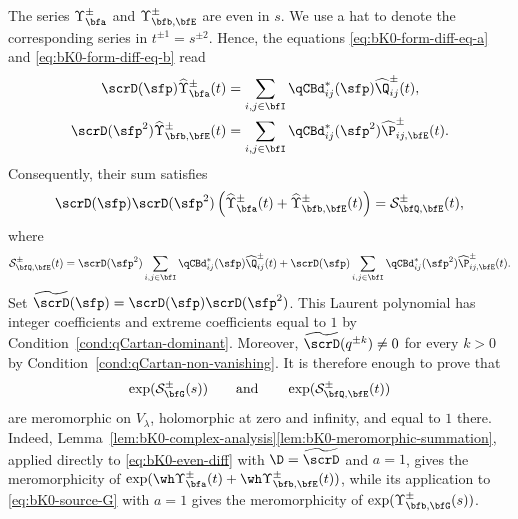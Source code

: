 \documentclass[reqno]{amsart}
\numberwithin{equation}{section}
\begin{document}
The series $\Upsilon_{\bfa}^\pm$ and
$\Upsilon_{\bfb,\bfE}^\pm$ are even in $s$. 
We use a hat to denote the corresponding
series in $t^{\pm1}=s^{\pm2}$. Hence,
the equations \eqref{eq:bK0-form-diff-eq-a} and
\eqref{eq:bK0-form-diff-eq-b} read
\begin{align}
\scrD(\sfp)\widehat\Upsilon_{\bfa}^\pm(t)
&=
\sum_{i,j\in\bfI}\qCBd^*_{ij}(\sfp)\widehat\Q_{ij}^\pm(t),
\label{eq:bK0-even-diff-a}\\
\scrD(\sfp^2)\widehat\Upsilon_{\bfb,\bfE}^\pm(t)
&=
\sum_{i,j\in\bfI}\qCBd^*_{ij}(\sfp^2)
\widehat\P_{ij,\bfE}^\pm(t).
\label{eq:bK0-even-diff-b}
\end{align}
Consequently, their sum satisfies
\begin{equation}\label{eq:bK0-even-diff}
\scrD(\sfp)\scrD(\sfp^2)
\left(
\widehat\Upsilon_{\bfa}^\pm(t)
+\widehat\Upsilon_{\bfb,\bfE}^\pm(t)
\right)
= \mathcal S_{\bfQ,\bfE}^\pm(t),
\end{equation}
where
\begin{equation}
\mathcal S_{\bfQ,\bfE}^\pm(t)
=
\scrD(\sfp^2)\sum_{i,j\in\bfI}\qCBd^*_{ij}(\sfp)
\widehat\Q_{ij}^\pm(t)
+
\scrD(\sfp)\sum_{i,j\in\bfI}\qCBd^*_{ij}(\sfp^2)
\widehat\P_{ij,\bfE}^\pm(t).
\end{equation}
{Set $\widetilde{\scrD}(\sfp)=\scrD(\sfp)\scrD(\sfp^2)$.
This Laurent polynomial has integer coefficients and extreme
coefficients equal to $1$ by Condition~\ref{cond:qCartan-dominant}.
Moreover, $\widetilde{\scrD}(q^{\pm k})\neq0$ for every $k>0$
by Condition~\ref{cond:qCartan-non-vanishing}.
It is therefore enough to prove that}
\begin{equation}\label{eq:bK0-meromorphic-sources}
\exp(\mathcal S_{\bfG}^\pm(s))
\qquad\text{and}\qquad
\exp(\mathcal S_{\bfQ,\bfE}^\pm(t))
\end{equation}
are meromorphic on $V_\lambda$, holomorphic at zero and infinity, and equal to $1$ there. Indeed,
Lemma~\ref{lem:bK0-complex-analysis}\eqref{lem:bK0-meromorphic-summation},
applied directly to \eqref{eq:bK0-even-diff} with
$\D=\widetilde{\scrD}$ and $a=1$, gives the meromorphicity of
$\exp(\wh\Upsilon_{\bfa}^\pm(t)
+\wh\Upsilon_{\bfb,\bfE}^\pm(t))$, while its
application to \eqref{eq:bK0-source-G} with $a=1$ gives the
meromorphicity of $\exp(\Upsilon_{\bfb,\bfG}^\pm(s))$.

\end{document}
